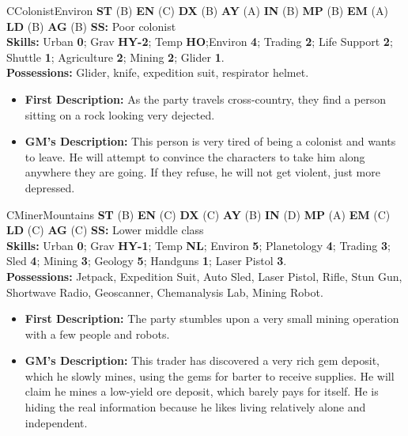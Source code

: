 \hrulefill

\begin{npc}{C}{Colonist}{Environ}
\textbf{ST} (B) \textbf{EN} (C) \textbf{DX} (B) \textbf{AY} (A) \textbf{IN} (B) \textbf{MP} (B) \textbf{EM} (A) \textbf{LD} (B) \textbf{AG} (B) \textbf{SS:} Poor colonist \\
\textbf{Skills:} Urban \textbf{0}; Grav \textbf{HY-2}; Temp \textbf{HO};Environ \textbf{4}; Trading \textbf{2}; Life Support \textbf{2}; Shuttle \textbf{1}; Agriculture \textbf{2}; Mining \textbf{2}; Glider \textbf{1}. \\
\textbf{Possessions:} Glider, knife, expedition suit, respirator helmet. 
\begin{itemize}
\item \textbf{First Description:} As the party travels cross-country, they find a person sitting on a rock looking very dejected. 
\item \textbf{GM's Description:} This person is very tired of being a colonist and wants to leave. He will attempt to convince the characters to take 
him along anywhere they are going. If they refuse, he will not get violent, just more depressed. 
\end{itemize}
\end{npc}

\hrulefill

\begin{npc}{C}{Miner}{Mountains}
\textbf{ST} (B) \textbf{EN} (C) \textbf{DX} (C) \textbf{AY} (B) \textbf{IN} (D) \textbf{MP} (A) \textbf{EM} (C) \textbf{LD} (C) \textbf{AG} (C) \textbf{SS:} Lower middle class \\
\textbf{Skills:} Urban \textbf{0}; Grav \textbf{HY-1}; Temp  \textbf{NL}; Environ \textbf{5}; Planetology \textbf{4}; Trading \textbf{3}; Sled \textbf{4}; Mining \textbf{3}; Geology \textbf{5}; Handguns \textbf{1}; Laser Pistol \textbf{3}. \\
\textbf{Possessions:} Jetpack, Expedition Suit, Auto Sled, Laser Pistol, Rifle, Stun Gun, Shortwave Radio, Geoscanner, Chemanalysis Lab, 
Mining Robot. 
\begin{itemize}
\item \textbf{First Description:} The party stumbles upon a very small mining operation with a few people and robots. 
\item \textbf{GM's Description:} This trader has discovered a very rich gem deposit, which he slowly mines, using the gems for barter to receive 
supplies. He will claim he mines a low-yield ore deposit, which barely pays for itself. He is hiding the real information because he likes 
living relatively alone and independent. 
\end{itemize}
\end{npc}

